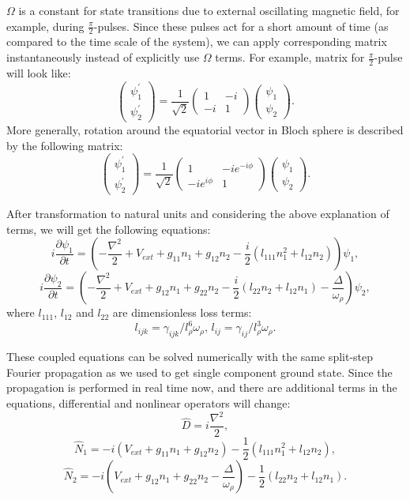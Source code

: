 \documentclass[12pt,notitlepage]{report}
\begin{document}
$\Omega$ is a constant for state transitions due to external oscillating magnetic field, for example, during $\frac{\pi}{2}$-pulses. Since these pulses act for a short amount of time (as compared to the time scale of the system), we can apply corresponding matrix instantaneously instead of explicitly use $\Omega$ terms. For example, matrix for $\frac{\pi}{2}$-pulse will look like:
\[
\begin{pmatrix}
	\psi^\prime_1 \\	\psi^\prime_2
\end{pmatrix} =
\frac{1}{\sqrt{2}} \begin{pmatrix}
	1 & -i \\ -i & 1
\end{pmatrix}
\begin{pmatrix}
	\psi_1 \\ \psi_2
\end{pmatrix}.
\]
More generally, rotation around the equatorial vector in Bloch sphere is described by the following matrix:
\begin{equation}
\label{rotation_matrix}
\begin{pmatrix}
	\psi^\prime_1 \\	\psi^\prime_2
\end{pmatrix} =
\frac{1}{\sqrt{2}} \begin{pmatrix}
	1 & -i e^{-i \phi} \\ -i e^{i \phi} & 1
\end{pmatrix}
\begin{pmatrix}
	\psi_1 \\ \psi_2
\end{pmatrix}.
\end{equation}

After transformation to natural units and considering the above explanation of terms, we will get the following equations:
\[ i \frac{\partial \psi_1}{\partial t} = \left(
	-\frac{\nabla^2}{2} + V_{ext} +
	g_{11} n_1 + g_{12} n_2 - \frac{i}{2} (l_{111} n_1^2 + l_{12} n_2)
\right) \psi_1, \]
\[ i \frac{\partial \psi_2}{\partial t} = \left(
	-\frac{\nabla^2}{2} + V_{ext} +
	g_{12} n_1 + g_{22} n_2 - \frac{i}{2} (l_{22} n_2 + l_{12} n_1) -
	\frac{\Delta}{\omega_\rho}
\right) \psi_2, \]
where $l_{111}$, $l_{12}$ and $l_{22}$ are dimensionless loss terms:
\[ l_{ijk} = \gamma_{ijk} / l_\rho^6 \omega_{\rho},\, l_{ij} = \gamma_{ij} / l_\rho^3 \omega_{\rho}. \]

These coupled equations can be solved numerically with the same split-step Fourier propagation as we used to get single component ground state. Since the propagation is performed in real time now, and there are additional terms in the equations, differential and nonlinear operators will change:
\[ \hat{D} = i \frac{\nabla^2}{2}, \]
\[ \hat{N}_1 = -i \left( V_{ext} + g_{11} n_1 + g_{12} n_2 \right) - \frac{1}{2} \left( l_{111} n_1^2 + l_{12} n_2 \right), \]
\[
\hat{N}_2 = -i \left( V_{ext} + g_{12} n_1 + g_{22} n_2 - \frac{\Delta}{\omega_\rho} \right) -
\frac{1}{2} \left( l_{22} n_2 + l_{12} n_1 \right).
\]
\end{document}
